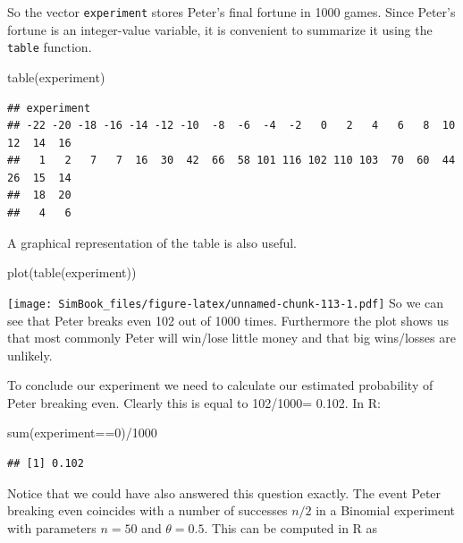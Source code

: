 \documentclass[
]{book}
\newenvironment{Shaded}{\begin{snugshade}}{\end{snugshade}}
\newcommand{\DecValTok}[1]{\textcolor[rgb]{0.00,0.00,0.81}{#1}}
\newcommand{\FunctionTok}[1]{\textcolor[rgb]{0.00,0.00,0.00}{#1}}
\newcommand{\NormalTok}[1]{#1}
\newcommand{\SpecialCharTok}[1]{\textcolor[rgb]{0.00,0.00,0.00}{#1}}
\begin{document}
So the vector \texttt{experiment} stores Peter's final fortune in 1000 games. Since Peter's fortune is an integer-value variable, it is convenient to summarize it using the \texttt{table} function.

\begin{Shaded}
\begin{Highlighting}[]
\FunctionTok{table}\NormalTok{(experiment)}
\end{Highlighting}
\end{Shaded}

\begin{verbatim}
## experiment
## -22 -20 -18 -16 -14 -12 -10  -8  -6  -4  -2   0   2   4   6   8  10  12  14  16 
##   1   2   7   7  16  30  42  66  58 101 116 102 110 103  70  60  44  26  15  14 
##  18  20 
##   4   6
\end{verbatim}

A graphical representation of the table is also useful.

\begin{Shaded}
\begin{Highlighting}[]
\FunctionTok{plot}\NormalTok{(}\FunctionTok{table}\NormalTok{(experiment))}
\end{Highlighting}
\end{Shaded}

\texttt{[image: SimBook\_files/figure-latex/unnamed-chunk-113-1.pdf]}
So we can see that Peter breaks even 102 out of 1000 times. Furthermore the plot shows us that most commonly Peter will win/lose little money and that big wins/losses are unlikely.

To conclude our experiment we need to calculate our estimated probability of Peter breaking even. Clearly this is equal to 102/1000= 0.102. In R:

\begin{Shaded}
\begin{Highlighting}[]
\FunctionTok{sum}\NormalTok{(experiment}\SpecialCharTok{==}\DecValTok{0}\NormalTok{)}\SpecialCharTok{/}\DecValTok{1000}
\end{Highlighting}
\end{Shaded}

\begin{verbatim}
## [1] 0.102
\end{verbatim}

Notice that we could have also answered this question exactly. The event Peter breaking even coincides with a number of successes \(n/2\) in a Binomial experiment with parameters \(n=50\) and \(\theta = 0.5\). This can be computed in R as
\end{document}
